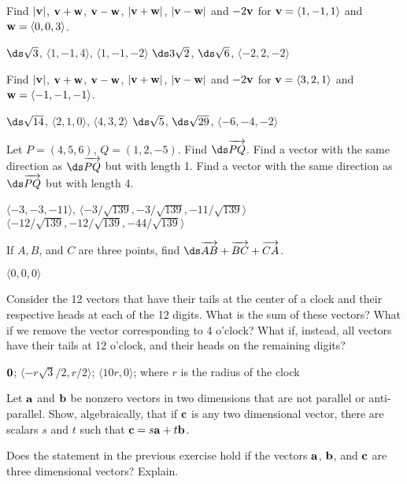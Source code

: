 \begin{exercises}
\exercise Find $|{\bf v}|$, ${\bf v}+{\bf w}$, ${\bf v}-{\bf w}$,
$|{\bf v}+{\bf w}|$, $|{\bf v}-{\bf w}|$ and $-2{\bf v}$ for
${\bf v} = \langle 1,-1,1\rangle$ and ${\bf w} = \langle 0,0,3\rangle$.
\begin{answer} $\ds \sqrt{3}$, $\langle 1,-1,4\rangle$, $\langle 1,-1,-2\rangle$
$\ds 3\sqrt{2}$, $\ds \sqrt{6}$, $\langle -2, 2, -2\rangle$
\end{answer}

\exercise Find $|{\bf v}|$, ${\bf v}+{\bf w}$, ${\bf v}-{\bf w}$,
$|{\bf v}+{\bf w}|$, $|{\bf v}-{\bf w}|$ and $-2{\bf v}$ for
${\bf v} = \langle 3,2,1\rangle$ and ${\bf w} = \langle -1,-1,-1\rangle$.
\begin{answer} $\ds \sqrt{14}$, $\langle 2,1,0\rangle$, $\langle 4,3,2\rangle$
$\ds \sqrt{5}$, $\ds \sqrt{29}$, $\langle -6,-4, -2\rangle$
\end{answer}

\exercise Let $P=(4,5,6)$, $Q=(1,2,-5)$. Find 
$\ds \overrightarrow{\vrule height8pt width 0pt PQ}$. Find a vector with
the same direction as $\ds \overrightarrow{\vrule height8pt width 0pt PQ}$
but with length 1. Find a vector with
the same direction as $\ds \overrightarrow{\vrule height8pt width 0pt PQ}$
but with length 4.
\begin{answer} $\langle -3, -3, -11\rangle$,
$\langle -3/\sqrt{139},-3/\sqrt{139},-11/\sqrt{139}\rangle$
$\langle -12/\sqrt{139},-12/\sqrt{139},-44/\sqrt{139}\rangle$
\end{answer}

\exercise If $A, B$, and $C$ are three points, find
$\ds \overrightarrow{\vrule height8pt width 0pt AB}+
\overrightarrow{\vrule height8pt width 0pt BC}+
\overrightarrow{\vrule height8pt width 0pt CA}$.
\begin{answer} $\langle 0,0,0\rangle$
\end{answer}

\exercise Consider the 12 vectors that have their tails at the center of a
clock and their respective heads at each of the 12 digits.  What is
the sum of these vectors?  What if we remove the vector corresponding
to 4 o'clock?  What if, instead, all vectors have their
tails at 12 o'clock, and their heads on the remaining digits?
\begin{answer} $\bf 0$; $\langle -r\sqrt3/2,r/2\rangle$; $\langle
10r,0\rangle$; where $r$ is the radius of the clock
\end{answer}

\exercise Let $\bf a$ and $\bf b$ be nonzero vectors in two dimensions
that are not parallel or anti-parallel.  Show, algebraically, that if
$\bf c$ is any two dimensional vector, there are scalars $s$ and $t$
such that ${\bf c}=s{\bf a}+t{\bf b}$.

\exercise Does the statement in the previous exercise hold if the vectors
$\bf a$, $\bf b$, and $\bf c$ are three dimensional vectors? Explain.

\end{exercises}
